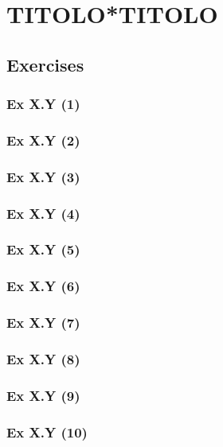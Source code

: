 
\section{TITOLO*TITOLO}\label{sec:X.Y}	
\subsection*{Exercises}\label{sec:X.Y_Exercises}
%
\subsubsection{Ex X.Y (1)}\label{sec:Ex_X.Y.1}
\subsubsection{Ex X.Y (2)}\label{sec:Ex_X.Y.2}
\subsubsection{Ex X.Y (3)}\label{sec:Ex_X.Y.3}
\subsubsection{Ex X.Y (4)}\label{sec:Ex_X.Y.4}
\subsubsection{Ex X.Y (5)}\label{sec:Ex_X.Y.5}
\subsubsection{Ex X.Y (6)}\label{sec:Ex_X.Y.6}
\subsubsection{Ex X.Y (7)}\label{sec:Ex_X.Y.7}
\subsubsection{Ex X.Y (8)}\label{sec:Ex_X.Y.8}
\subsubsection{Ex X.Y (9)}\label{sec:Ex_X.Y.9}
\subsubsection{Ex X.Y (10)}\label{sec:Ex_X.Y.10}

